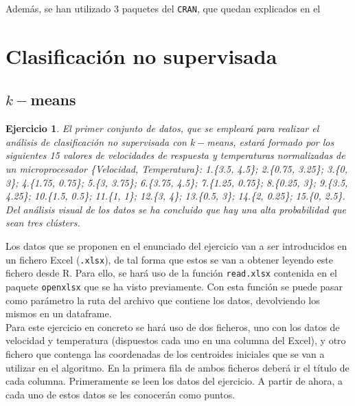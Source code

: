 \documentclass[12pt]{report}\usepackage[]{graphicx}\usepackage[dvipsnames]{xcolor}
\newtheorem{exercise}{Ejercicio}[section]
\begin{document}
		 Además, se han utilizado 3 paquetes del \texttt{CRAN}, que quedan explicados en el 
		 
		 \section{Clasificación no supervisada}
		 
		 	\subsection{$k-$means}
		 
				 \begin{exercise}\label{ex:kmeans}
					 	El primer conjunto de datos, que se empleará para realizar el análisis de clasificación no supervisada con $k-$means, estará formado por los siguientes 15 valores de velocidades de respuesta y temperaturas normalizadas de un microprocesador \{Velocidad, Temperatura\}: 1.\{3.5, 4.5\}; 2.\{0.75, 3.25\}; 3.\{0, 3\}; 4.\{1.75, 0.75\}; 5.\{3, 3.75\}; 6.\{3.75, 4.5\}; 7.\{1.25, 0.75\}; 8.\{0.25, 3\}; 9.\{3.5, 4.25\}; 10.\{1.5, 0.5\}; 11.\{1, 1\}; 12.\{3, 4\}; 13.\{0.5, 3\}; 14.\{2, 0.25\}; 15.\{0, 2.5\}. Del análisis visual de los datos se ha concluido que hay una alta probabilidad que sean tres clústers.
				 \end{exercise}
				 
				 Los datos que se proponen en el enunciado del ejercicio van a ser introducidos en un fichero Excel (\texttt{.xlsx}), de tal forma que estos se van a obtener leyendo este fichero desde R. Para ello, se hará uso de la función \texttt{read.xlsx} contenida en el paquete \texttt{openxlsx} que se ha visto previamente. Con esta función se puede pasar como parámetro la ruta del archivo que contiene los datos, devolviendo los mismos en un dataframe.\\
				 
				 Para este ejercicio en concreto se hará uso de dos ficheros, uno con los datos de velocidad y temperatura (dispuestos cada uno en una columna del Excel), y otro fichero que contenga las coordenadas de los centroides iniciales que se van a utilizar en el algoritmo. En la primera fila de ambos ficheros deberá ir el título de cada columna. Primeramente se leen los datos del ejercicio. A partir de ahora, a cada uno de estos datos se les conocerán como puntos.
				 
\end{document}
